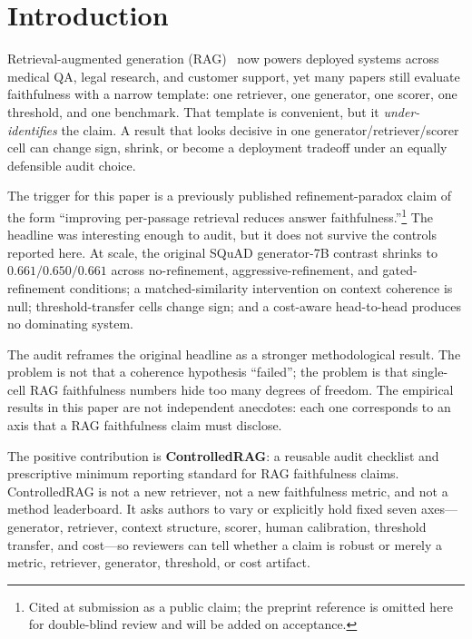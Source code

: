 \section{Introduction}
\label{sec:intro}

Retrieval-augmented generation (RAG)~\citep{lewis2020rag} now powers
deployed systems across medical QA, legal research, and customer
support, yet many papers still evaluate faithfulness with a narrow
template: one retriever, one generator, one scorer, one threshold, and
one benchmark. That template is convenient, but it
\emph{under-identifies} the claim. A result that looks decisive in one
generator/retriever/scorer cell can change sign, shrink, or become a
deployment tradeoff under an equally defensible audit choice.

The trigger for this paper is a previously published refinement-paradox
claim of the form ``improving per-passage retrieval reduces answer
faithfulness.''\footnote{Cited at submission as a public claim; the
preprint reference is omitted here for double-blind review and will
be added on acceptance.} The headline was interesting enough to
audit, but it does not survive the controls reported here. At scale,
the original SQuAD generator-7B contrast shrinks to
$0.661 / 0.650 / 0.661$ across no-refinement, aggressive-refinement,
and gated-refinement conditions; a matched-similarity intervention on
context coherence is null; threshold-transfer cells change sign; and
a cost-aware head-to-head produces no dominating system.

The audit reframes the original headline as a stronger
methodological result. The problem is not that a coherence hypothesis
``failed''; the problem is that single-cell RAG faithfulness numbers
hide too many degrees of freedom. The empirical results in this paper
are not independent anecdotes: each one corresponds to an axis that a
RAG faithfulness claim must disclose.

The positive contribution is \textbf{ControlledRAG}: a reusable audit
checklist and prescriptive minimum reporting standard for RAG
faithfulness claims. ControlledRAG is not a new retriever, not a new
faithfulness metric, and not a method leaderboard. It asks authors to
vary or explicitly hold fixed seven axes---generator, retriever,
context structure, scorer, human calibration, threshold transfer, and
cost---so reviewers can tell whether a claim is robust or merely a
metric, retriever, generator, threshold, or cost artifact.

